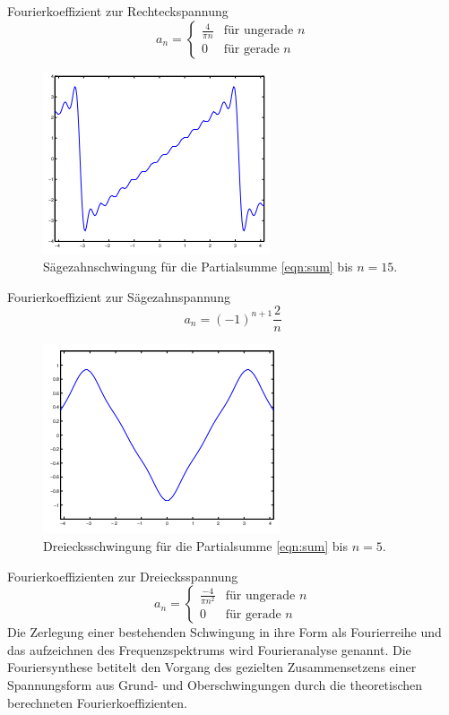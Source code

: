 Fourierkoeffizient zur Rechteckspannung
\begin{equation}
  a_n =
  \begin{cases}
      \frac{4}{\pi n} & \text{für ungerade } n\\
      0 & \text{für gerade } n
  \end{cases}
  \label{eqn:rechteck}
\end{equation}
\begin{figure}[H]
  \centering
  \includegraphics{content/images/saege_theo_n=15.png}
  \caption{Sägezahnschwingung für die Partialsumme \eqref{eqn:sum} bis $n=15$\cite{koeff}.}
  \label{fig:saege_theo}
\end{figure}
Fourierkoeffizient zur Sägezahnspannung
\begin{equation}
  a_n = (-1)^{n+1}\frac{2}{n}
  \label{eqn:saege}
\end{equation}
\begin{figure}[H]
  \centering
  \includegraphics{content/images/dreieck_theo_n=5.png}
  \caption{Dreiecksschwingung für die Partialsumme \eqref{eqn:sum} bis $n=5$\cite{koeff}.}
  \label{fig:dreieck_theo}
\end{figure}
Fourierkoeffizienten zur Dreiecksspannung
\begin{equation}
  a_n =
  \begin{cases}
    \frac{-4}{\pi n^2} & \text{für ungerade }n\\
    0 & \text{für gerade }n
  \end{cases}
  \label{eqn:dreieck}
\end{equation}
Die Zerlegung einer bestehenden Schwingung in ihre Form als Fourierreihe
und das aufzeichnen des Frequenzspektrums wird Fourieranalyse genannt.
Die Fouriersynthese betitelt den Vorgang des gezielten Zusammensetzens
einer Spannungsform aus Grund- und Oberschwingungen durch die theoretischen
berechneten Fourierkoeffizienten.
